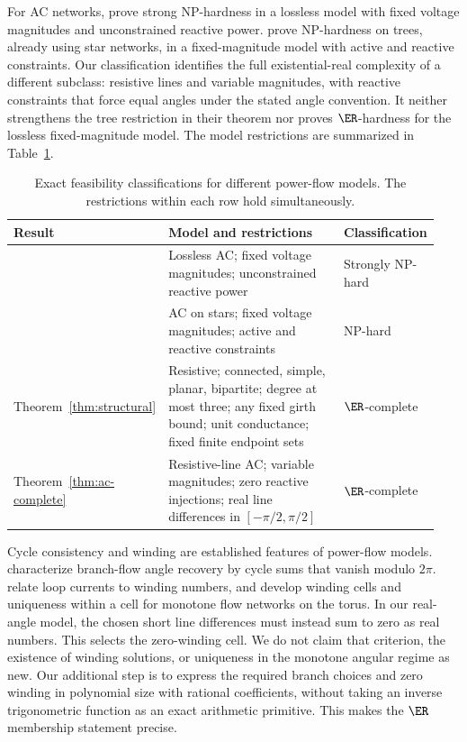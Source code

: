 For AC networks, \citet{BienstockVerma2019} prove strong NP-hardness in a
lossless model with fixed voltage magnitudes and unconstrained reactive
power. \citet{LehmannEtAl2016} prove NP-hardness on trees, already using star
networks, in a fixed-magnitude model with active and reactive constraints.
Our classification identifies the full existential-real complexity of a
different subclass: resistive lines and variable magnitudes, with reactive
constraints that force equal angles under the stated angle convention.
It neither strengthens the tree restriction in their theorem nor proves
$\ER$-hardness for the lossless fixed-magnitude model. The model
restrictions are summarized in
Table~\ref{tab:prior-complexity}.

\begin{table}[t]
\centering
\small
\caption{Exact feasibility classifications for different power-flow models.
The restrictions within each row hold simultaneously.}
\label{tab:prior-complexity}
\begin{tabular}{@{}p{0.23\linewidth}p{0.49\linewidth}p{0.22\linewidth}@{}}
\toprule
Result & Model and restrictions & Classification \\
\midrule
\citet{BienstockVerma2019} & Lossless AC; fixed voltage magnitudes;
unconstrained reactive power & Strongly NP-hard \\
\addlinespace
\citet{LehmannEtAl2016} & AC on stars; fixed voltage magnitudes;
active and reactive constraints & NP-hard \\
\addlinespace
Theorem~\ref{thm:structural} & Resistive; connected, simple, planar,
bipartite; degree at most three; any fixed girth bound; unit conductance;
fixed finite endpoint sets & $\ER$-complete \\
\addlinespace
Theorem~\ref{thm:ac-complete} & Resistive-line AC; variable magnitudes;
zero reactive injections; real line differences in $[-\pi/2,\pi/2]$
& $\ER$-complete \\
\bottomrule
\end{tabular}
\end{table}

Cycle consistency and winding are established features of power-flow
models. \citet[Theorem 2]{FarivarLow2013} characterize branch-flow angle
recovery by cycle sums that vanish modulo $2\pi$.
\citet{DelabaysEtAl2016} relate loop currents to winding numbers, and
\citet{JafarpourEtAl2022} develop winding cells and uniqueness within a cell
for monotone flow networks on the torus. In our real-angle model, the
chosen short line differences must instead sum to zero as real numbers.
This selects the zero-winding cell. We do not claim that criterion, the
existence of winding solutions, or uniqueness in the monotone angular
regime as new. Our additional step is to express the required branch
choices and zero winding in polynomial size with rational coefficients,
without taking an inverse trigonometric function as an exact arithmetic
primitive. This makes the $\ER$ membership statement precise.

